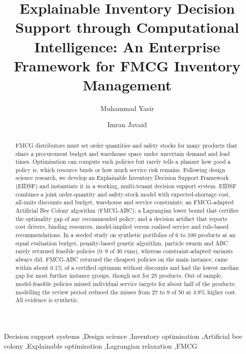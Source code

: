 \documentclass[preprint,12pt,authoryear]{elsarticle}
\begin{document}
\begin{frontmatter}

\title{Explainable Inventory Decision Support through Computational Intelligence: An Enterprise Framework for FMCG Inventory Management}

\author[caspam]{Muhammad Yasir}
\author[caspam]{Imran Javaid}

\begin{abstract}
FMCG distributors must set order quantities and safety stocks for many products that share a procurement budget and warehouse space under uncertain demand and lead times. Optimisation can compute such policies but rarely tells a planner how good a policy is, which resource binds or how much service risk remains. Following design science research, we develop an Explainable Inventory Decision Support Framework (EIDSF) and instantiate it in a working, multi-tenant decision support system. EIDSF combines a joint order-quantity and safety-stock model with expected-shortage cost, all-units discounts and budget, warehouse and service constraints; an FMCG-adapted Artificial Bee Colony algorithm (FMCG-ABC); a Lagrangian lower bound that certifies the optimality gap of any recommended policy; and a decision artifact that reports cost drivers, binding resources, model-implied versus realised service and rule-based recommendations. In a seeded study on synthetic portfolios of 6 to 100 products at an equal evaluation budget, penalty-based genetic algorithm, particle swarm and ABC rarely returned feasible policies (0--9 of 30 runs), whereas constraint-adapted variants always did. FMCG-ABC returned the cheapest policies on the main instance, came within about 0.1\% of a certified optimum without discounts and had the lowest median gap for most further instance groups, though not for 25 products. Out of sample, model-feasible policies missed individual service targets for about half of the products; modelling the review period reduced the misses from 27 to 9 of 50 at 3.9\% higher cost. All evidence is synthetic.
\end{abstract}

\begin{keyword}
Decision support systems \sep Design science \sep Inventory optimisation \sep Artificial bee colony \sep Explainable optimisation \sep Lagrangian relaxation \sep FMCG
\end{keyword}

\end{frontmatter}
\end{document}
